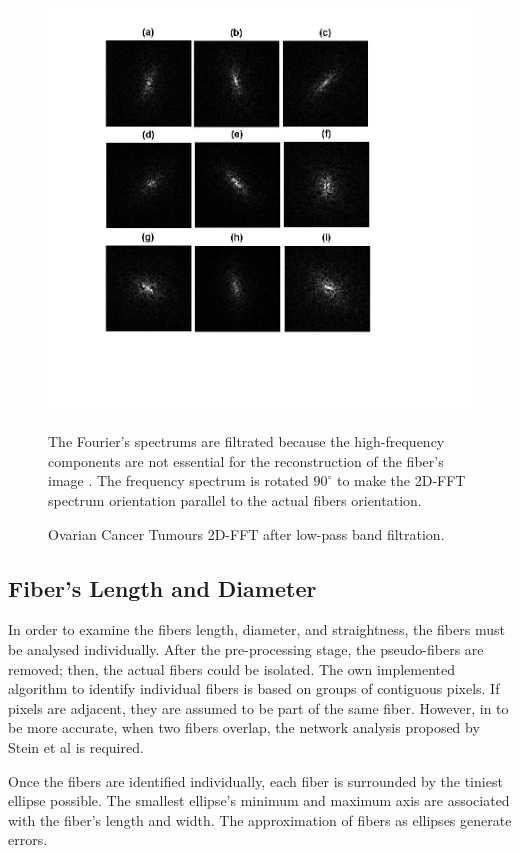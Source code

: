 \documentclass[12pt,a4paper]{article}
\begin{document}
\begin{figure}
  \includegraphics[width=\linewidth]{FiguresDisertation/figure6.jpg}
  \caption{Ovarian Cancer Tumours 2D-FFT after low-pass band filtration.}
  \medskip
  \small
  The Fourier's spectrums are filtrated because the high-frequency components are not essential for the reconstruction of the fiber's image . The frequency spectrum is rotated $90^{\circ}$ to make the 2D-FFT spectrum orientation parallel to the actual fibers orientation.
\end{figure}
\subsection{Fiber's Length and Diameter}
In order to examine the fibers length, diameter, and straightness, the fibers must be analysed individually. After the pre-processing stage, the pseudo-fibers are removed; then, the actual fibers could be isolated. The own implemented algorithm to identify individual fibers is based on groups of contiguous pixels. If pixels are adjacent, they are assumed to be part of the same fiber. However, in to be more accurate, when two fibers overlap, the network analysis proposed by Stein et al is required.

Once the fibers are identified individually, each fiber is surrounded by the tiniest ellipse possible. The smallest ellipse's minimum and maximum axis are associated with the fiber's length and width. The approximation of fibers as ellipses generate errors. 
\end{document}
